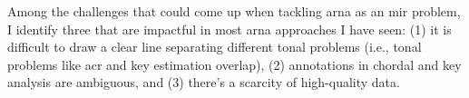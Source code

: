 

Among the challenges that could come up when tackling
\gls{arna} as an \gls{mir} problem, I identify three that
are impactful in most \gls{arna} approaches I have seen: (1)
it is difficult to draw a clear line separating different
tonal problems (i.e., tonal problems like \gls{acr} and key
estimation overlap), (2) annotations in chordal and key
analysis are ambiguous, and (3) there's a scarcity of
high-quality data.
